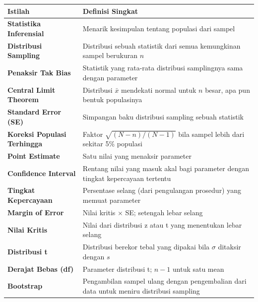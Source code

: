 \documentclass[
  indonesian,
  letterpaper,
]{book}
\newcounter{none} %
\begin{document}
{\def\LTcaptype{none} %
\begin{longtable}[]{@{}
  >{\raggedright\arraybackslash}p{}
  >{\raggedright\arraybackslash}p{}@{}}
\toprule\noalign{}
\begin{minipage}[b]{\linewidth}\raggedright
Istilah
\end{minipage} & \begin{minipage}[b]{\linewidth}\raggedright
Definisi Singkat
\end{minipage} \\
\midrule\noalign{}
\endhead
\bottomrule\noalign{}
\endlastfoot
\textbf{Statistika Inferensial} & Menarik kesimpulan tentang populasi
dari sampel \\
\textbf{Distribusi Sampling} & Distribusi sebuah statistik dari semua
kemungkinan sampel berukuran \(n\) \\
\textbf{Penaksir Tak Bias} & Statistik yang rata-rata distribusi
samplingnya sama dengan parameter \\
\textbf{Central Limit Theorem} & Distribusi \(\bar{x}\) mendekati normal
untuk \(n\) besar, apa pun bentuk populasinya \\
\textbf{Standard Error (SE)} & Simpangan baku distribusi sampling sebuah
statistik \\
\textbf{Koreksi Populasi Terhingga} & Faktor \(\sqrt{(N-n)/(N-1)}\) bila
sampel lebih dari sekitar 5\% populasi \\
\textbf{Point Estimate} & Satu nilai yang menaksir parameter \\
\textbf{Confidence Interval} & Rentang nilai yang masuk akal bagi
parameter dengan tingkat kepercayaan tertentu \\
\textbf{Tingkat Kepercayaan} & Persentase selang (dari pengulangan
prosedur) yang memuat parameter \\
\textbf{Margin of Error} & Nilai kritis \(\times\) SE; setengah lebar
selang \\
\textbf{Nilai Kritis} & Nilai dari distribusi z atau t yang menentukan
lebar selang \\
\textbf{Distribusi t} & Distribusi berekor tebal yang dipakai bila
\(\sigma\) ditaksir dengan \(s\) \\
\textbf{Derajat Bebas (df)} & Parameter distribusi t; \(n - 1\) untuk
satu mean \\
\textbf{Bootstrap} & Pengambilan sampel ulang dengan pengembalian dari
data untuk meniru distribusi sampling \\
\end{longtable}
}
\end{document}
